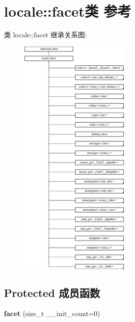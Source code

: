 \hypertarget{classlocale_1_1facet}{}\section{locale\+:\+:facet类 参考}
\label{classlocale_1_1facet}
类 locale\+:\+:facet 继承关系图\+:\begin{figure}[H]
\begin{center}
\leavevmode
\includegraphics[height=12.000000cm]{classlocale_1_1facet}
\end{center}
\end{figure}
\subsection*{Protected 成员函数}
\begin{DoxyCompactItemize}
\item 
\mbox{\label{classlocale_1_1facet_a5a52c48fe0b2ab6b8fb268534bf03220}} 
{\bfseries facet} (size\+\_\+t \+\_\+\+\_\+init\+\_\+count=0)
\end{DoxyCompactItemize}
